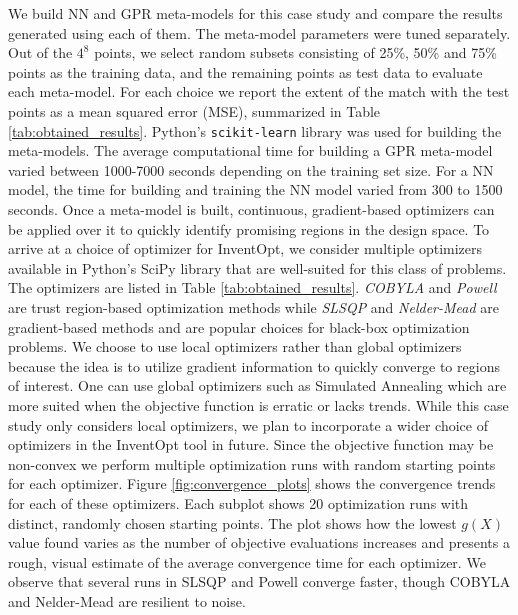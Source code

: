 We build NN and GPR meta-models for this case study and compare the results generated using each of them. The meta-model parameters were tuned separately. 
Out of the $4^8$ points, we select random subsets consisting of 25\%, 50\% and 75\% points as the training data, and the remaining points as test data to evaluate each meta-model. For each choice we report the extent of the match with the test points as a mean squared error (MSE), summarized in Table \ref{tab:obtained_results}. Python's \texttt{scikit-learn} library \cite{scikit-learn} was used for building the meta-models. 
%
The average computational time for building a GPR meta-model varied between 1000-7000 seconds depending on the training set size. For a NN model, the time for building and training the NN model varied from 300 to 1500 seconds. 
%
Once a meta-model is built, continuous, gradient-based optimizers can be applied over it to quickly identify promising regions in the design space. To arrive at a choice of optimizer for InventOpt, we consider multiple optimizers available in Python's SciPy library that are well-suited for this class of problems. The optimizers are listed in Table \ref{tab:obtained_results}. \textit{COBYLA} and \textit{Powell} are trust region-based optimization methods while \textit{SLSQP} and \textit{Nelder-Mead} are gradient-based methods and are popular choices for black-box optimization problems. We choose to use local optimizers rather than global optimizers because the idea is to utilize gradient information to quickly converge to regions of interest. One can use global optimizers such as Simulated Annealing which are more suited when the objective function is erratic or lacks trends. While this case study only considers local optimizers, we plan to incorporate a wider choice of optimizers in the InventOpt tool in future. Since the objective function may be non-convex we perform multiple optimization runs with random starting points for each optimizer.  Figure \ref{fig:convergence_plots} shows the convergence trends for each of these optimizers. Each subplot shows 20 optimization runs with distinct, randomly chosen starting points. The plot shows how the lowest $g(X)$ value found varies as the number of objective evaluations increases and presents a rough, visual estimate of the average convergence time for each optimizer. We observe that several runs in SLSQP and Powell converge faster,  though COBYLA and Nelder-Mead are resilient to noise. 
